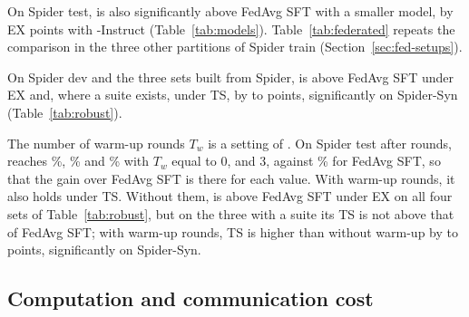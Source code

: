 On Spider test, \method{} is also significantly above FedAvg SFT with a
smaller model, by  EX points with
-Instruct (Table~\ref{tab:models}). Table~\ref{tab:federated} repeats the
comparison in the three other partitions of Spider train
(Section~\ref{sec:fed-setups}).

On Spider dev and the three sets built from Spider, \method{} is above
FedAvg SFT under EX and, where a suite exists, under TS, by
 to  points,
significantly on Spider-Syn (Table~\ref{tab:robust}).

The number of warm-up rounds $T_w$ is a setting of \method. On Spider
test after  rounds, \method{} reaches
\%, \% and \% with
$T_w$ equal to 0,  and 3, against
\% for FedAvg SFT, so that the gain over FedAvg SFT
is there for each value. With  warm-up rounds, it
also holds under TS. Without them, \method{} is above FedAvg SFT under EX
on all four sets of Table~\ref{tab:robust}, but on the three with a
suite its TS is not above that of FedAvg SFT; with
 warm-up rounds, TS is higher than without
warm-up by
 to 
points, significantly on Spider-Syn.

\subsection{Computation and communication cost}\label{sec:cost}

\begin{table}[!ht]
\caption{Cost of a round in the main setups, summed over the
 clients run one after another on one
GPU. ``Trained on'': the questions of a FedAvg SFT round, or those that
yield pairs and their pairs. GPU minutes cover sampling and training,
labeling minutes the elapsed time of executing the samples on
 threads, and ``Sent'' the upload of a
client.}\label{tab:cost}
\footnotesize

\end{table}

